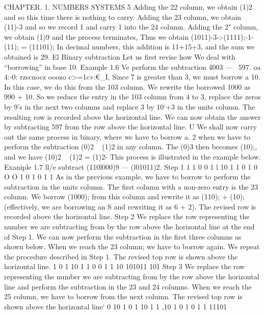 
CHAPTER. 1. NUMBERS SYSTEMS 5
Adding the 22 column, we obtain (1)2 and so this time there is nothing to carry. Adding the
23 column, we obtain (11)-3 and so we record 1 and carry 1 into the 24 column. Adding the
2" column, we obtain (1)9 and the process terminates,
Thus we obtain (1011)-3-:-(1111);-1-(11); = (11101); In decimal numbers, this addition is 11+15+3,
and the sum we obtained is 29. El
Binary subtraction
Let us first revise how We deal with “borrowing” in base 10.
Example 1.6 \¢Ve perform the subtraction 4003 —~ 597.
oa 4:-0:
rzscnocz
ooozo
c>=1c»:€_I,
Since 7 is greater than 3, we must borrow a 10. In this case, we do this from the 103 column. We
rewrite the borrowed 1000 as 990 + 10. So we reduce the entry in the 103 column from 4 to 3,
replace the zeros by 9’s in the next two columns and replace 3 by 10‘+3 in the units column. The
resulting row is recorded above the horizontal line. We can now obtain the answer by subtracting
597 from the row above the horizontal line. U
We shall now carry out the same process in binary, where we have to borrow a. 2 when we have to
perform the subtraction (0)2 ~ (1)2 in any column. The (0)3 then becomes (10);, and we have
(10)2 ~ (1)2 = (1)2-
This process is illustrated in the example below.
Exaniple 1.7 ll/e subtract (110l000)9 — (l01011)2.
Step 1
1 1 0 0 1 l 10
1 1 0 1 0 O O
1 0 1 0 1 1
As in the previous example, we have to borrow to perform the subtraction in the units
column. The ﬁrst column with a non-zero entry is the 23 column. We borrow (1000); from
this column and rewrite it as (110); + (10); (effectively, we are borrowing an S and rewriting
it as 6 + 2). The revised row is recorded above the horizontal line.
Step 2 We replace the row representing the number we are subtracting from by the row above
the horizontal line at the end of Step 1. We can now perform the subtraction in the ﬁrst
three columns as shown below. When we reach the 23 column; we have to borrow again. We
repeat the procedure described in Step 1. The revised top row is shown above the horizontal
line.
1 0 1 10
1 1 0 0 1 1 10
101011
101
Step 3 We replace the row representing the number we are subtracting from by the row above
the horizontal line and perform the subtraction in the 23 and 24 columns. When we reach
the 25 column, we have to borrow from the next column. The revised top row is shown above
the horizontal line‘
0 10
1 0 1 10 1 1 ,10
1 0 1 0 1 1
11101




